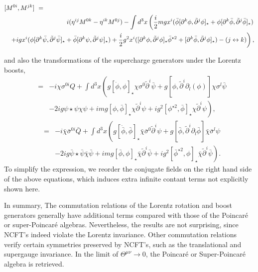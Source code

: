 \documentclass[a4paper,a4paper]{article}
\begin{document}
\begin{eqnarray}
\lefteqn{[M^{0i},M^{jk}]~=~}\nonumber\\
&&i(\eta^{ij}M^{0k}-\eta^{ik}M^{0j})-\int d^3x \left(
\frac i2 mgx^i(\bar{\phi}[\partial^k\phi,\tilde{\partial}^j\phi]_\star
+\phi[\partial^k\bar{\phi},\tilde{\partial}^j\bar{\phi}]_\star)\right.\nonumber\\
&& \left.+igx^i(\phi[\partial^k\bar{\psi},\tilde{\partial}^j\bar{\psi}]_\star
         +\bar{\phi}[\partial^k\psi,\tilde{\partial}^j\psi]_\star)
   +\frac i2 g^2x^i([\partial^k\phi,\tilde{\partial}^j\phi]_\star\bar{\phi}^{\star 2}
                   +[\partial^k\bar{\phi},\tilde{\partial}^j\phi]_\star)
  -(j\leftrightarrow k)\right),
\end{eqnarray}
 
and also the transformations of the supercharge generators under the Lorentz boosts, 
\begin{eqnarray}
[M^{0i}, \chi Q] & = & -i\chi \sigma^{0i}Q
+\int d^3x\left(g[\dot{\phi},\phi]_\star\chi\sigma^0\tilde{\partial}^i\bar{\psi}
+g[\phi,\tilde{\partial}^i\partial_l(\phi)]\chi\sigma^l\bar{\psi}\right.\nonumber\\
& & \left.-2ig\psi\star\psi\chi\psi
+img[\phi,\bar{\phi}]_\star\chi\tilde{\partial}^i\psi
+ig^2[\phi^{\star 2},\bar{\phi}]_\star\chi\tilde{\partial}^i\psi\right),
\end{eqnarray}
\begin{eqnarray}
[M^{0i}, \bar{\chi} \bar{Q}] & = & -i\bar{\chi} \bar{\sigma}^{0i}\bar{Q}
+\int d^3x\left(g[\dot{\bar{\phi}},\bar{\phi}]_\star\bar{\chi}\bar{\sigma}^0\tilde{\partial}^i\psi
+g[\bar{\phi},\tilde{\partial}^i\partial_l\bar{\phi}]\bar{\chi}\bar{\sigma}^l\psi
\right.\nonumber\\
& & \left.-2ig\bar{\psi}\star\bar{\psi}\bar{\chi}\bar{\psi}
+img[\bar{\phi},\phi]_\star\bar{\chi}\tilde{\partial}^i\bar{\psi}
+ig^2[\bar{\phi}^{\star 2},\phi]_\star\bar{\chi}\tilde{\partial}^i\bar{\psi}\right).
\end{eqnarray}
To simplify the expression, we reorder the conjugate fields
on the right hand side of the above equations, which induces extra infinite contant terms 
not explicitly shown here. 

In summary,  The commutation relations of the Lorentz
rotation and boost generators generally have additional terms 
compared with those of the Poincar\'{e} or super-Poincar\'{e} algebras. 
Nevertheless, the results are not surprising, since NCFT's 
indeed violate the Lorentz invariance. Other commutation relations
verify certain symmetries preserved by NCFT's, such as 
the translational and supergauge invariance. In the limit of 
$\Theta^{\mu\nu}\rightarrow 0$, the Poincar\'{e} or Super-Poincar\'{e} algebra is retrieved.
\end{document}

